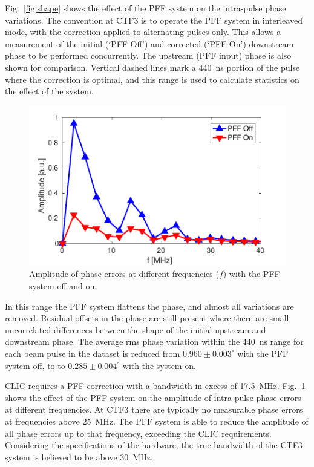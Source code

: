 \documentclass[%
 reprint,
superscriptaddress,
 amsmath,amssymb,
 prl,
]{revtex4-1}
\begin{document}
Fig.~\ref{fig:shape} shows the effect of the PFF system on the intra-pulse 
phase variations. The convention at CTF3 is to 
operate the PFF system in interleaved mode, with 
the correction applied to alternating pulses only. This allows a measurement of 
the initial (`PFF Off') and corrected (`PFF On') downstream phase to be 
performed concurrently. The upstream (PFF input) phase is also shown for 
comparison. Vertical dashed lines mark a 440~ns portion of the pulse where the 
correction is optimal, and this range is used to calculate statistics on the 
effect of the system. 

\begin{figure}
	\includegraphics[width=\columnwidth]{figs/fft}%
	\caption{\label{fig:fft}Amplitude of phase errors at different frequencies 
		(\(f\)) with the PFF system off and on.}
\end{figure}

In this range the PFF system flattens the phase, 
and almost all variations are removed. Residual offsets in the phase are still 
present where there are small uncorrelated differences between the shape of the 
initial upstream and downstream phase. 
The average rms phase variation within the 440~ns range 
for each beam pulse in the dataset is reduced from \(0.960\pm0.003^\circ\) with 
the PFF system off, to to \(0.285\pm0.004^\circ\) with the system on.

CLIC requires a PFF correction with a bandwidth in excess of 17.5~MHz. 
Fig.~\ref{fig:fft} shows the effect of the PFF system on the amplitude of 
intra-pulse phase errors at different frequencies. At CTF3 there are typically 
no measurable phase errors at frequencies above 25~MHz. The PFF system is able 
to reduce the amplitude of all phase errors up to that frequency, exceeding the 
CLIC requirements. Considering the specifications of the hardware, the true 
bandwidth of the CTF3 system is believed to be above 30~MHz.
\end{document}
